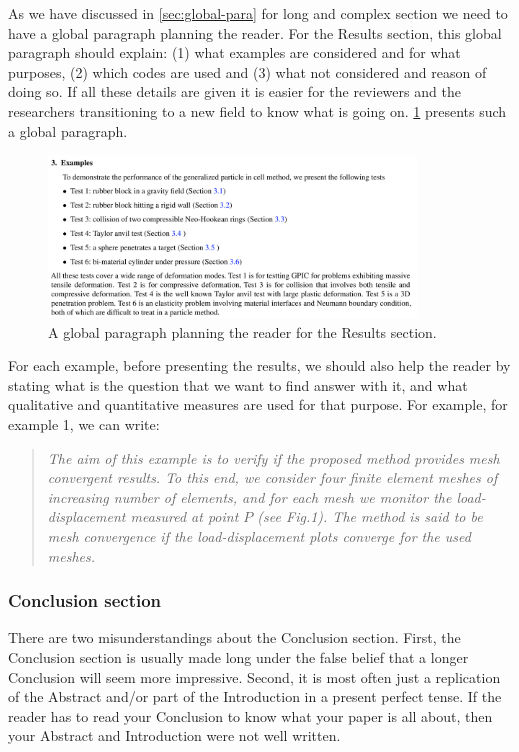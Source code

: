 \documentclass[authoryear,12pta4paper,fleqn]{article}
\numberwithin{equation}{section}
\theoremstyle{remark}
\begin{document}
As we have discussed in \cref{sec:global-para} for long and complex section we need to have a global paragraph planning the reader. For the Results section, this global paragraph should explain: (1) what examples are considered and for what purposes, (2) which codes are used and (3) what not considered and reason of doing so. If all these details are given it is easier for the reviewers and the researchers transitioning to a new field to know what is going on. \cref{fig:examples} presents such a global paragraph.

\begin{figure}[h!]
\centering
\includegraphics[width=0.87\textwidth]{examples}
\caption{A global paragraph planning the reader for the Results section.}
\label{fig:examples}
\end{figure}

For each example, before presenting the results, we should also help the reader by stating what is the question that we want to find answer with it, and what qualitative and quantitative measures are used for that purpose. For example, for example 1, we can write:

\begin{quote}
  \textit{
  The aim of this example is to verify if the proposed method provides mesh convergent results. To this end, we consider four finite element meshes of increasing number of elements, and for each mesh we monitor the load-displacement measured at point $P$ (see Fig.1). The method is said to be mesh convergence if the load-displacement plots converge for the used meshes.
  }
\end{quote}

\subsubsection{Conclusion section}\label{sec:conclusion-part}

There are two misunderstandings about the Conclusion section. First, the Conclusion section is usually made long under the false belief that a longer Conclusion will seem more impressive. Second, it is most often just a replication of the Abstract and/or part of the Introduction in a present perfect tense. If the reader has to read your Conclusion to know what your paper is all about, then your Abstract and Introduction were not well written.
\end{document}

